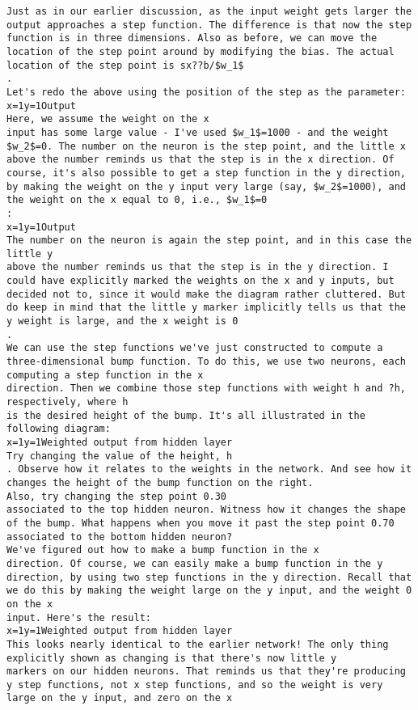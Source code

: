 \begin{lstlisting}
Just as in our earlier discussion, as the input weight gets larger the output approaches a step function. The difference is that now the step function is in three dimensions. Also as before, we can move the location of the step point around by modifying the bias. The actual location of the step point is sx??b/$w_1$
.
Let's redo the above using the position of the step as the parameter:
x=1y=1Output
Here, we assume the weight on the x
input has some large value - I've used $w_1$=1000 - and the weight $w_2$=0. The number on the neuron is the step point, and the little x above the number reminds us that the step is in the x direction. Of course, it's also possible to get a step function in the y direction, by making the weight on the y input very large (say, $w_2$=1000), and the weight on the x equal to 0, i.e., $w_1$=0
:
x=1y=1Output
The number on the neuron is again the step point, and in this case the little y
above the number reminds us that the step is in the y direction. I could have explicitly marked the weights on the x and y inputs, but decided not to, since it would make the diagram rather cluttered. But do keep in mind that the little y marker implicitly tells us that the y weight is large, and the x weight is 0
.
We can use the step functions we've just constructed to compute a three-dimensional bump function. To do this, we use two neurons, each computing a step function in the x
direction. Then we combine those step functions with weight h and ?h, respectively, where h
is the desired height of the bump. It's all illustrated in the following diagram:
x=1y=1Weighted output from hidden layer
Try changing the value of the height, h
. Observe how it relates to the weights in the network. And see how it changes the height of the bump function on the right.
Also, try changing the step point 0.30
associated to the top hidden neuron. Witness how it changes the shape of the bump. What happens when you move it past the step point 0.70
associated to the bottom hidden neuron?
We've figured out how to make a bump function in the x
direction. Of course, we can easily make a bump function in the y direction, by using two step functions in the y direction. Recall that we do this by making the weight large on the y input, and the weight 0 on the x
input. Here's the result:
x=1y=1Weighted output from hidden layer
This looks nearly identical to the earlier network! The only thing explicitly shown as changing is that there's now little y
markers on our hidden neurons. That reminds us that they're producing y step functions, not x step functions, and so the weight is very large on the y input, and zero on the x

\end{lstlisting}
